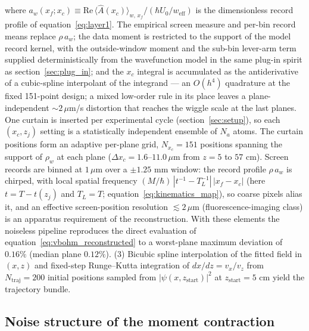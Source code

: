 \documentclass[11pt,a4paper]{article}
\newcommand{\weakvalps}[2]{\langle #1 \rangle_{w,\,#2}}
\begin{document}
where $a_w(x_f;x_c) \equiv \mathrm{Re}\,\weakvalps{\hat A(x_c)}{x_f}/(\hbar U_0/w_\text{eff})$ is the dimensionless record profile of equation~\eqref{eq:layer1}. The empirical screen measure and per-bin record means replace $\rho\,a_w$; the data moment is restricted to the support of the model record kernel, with the outside-window moment and the sub-bin lever-arm term supplied deterministically from the wavefunction model in the same plug-in spirit as section~\ref{sec:plug_in}; and the $x_c$ integral is accumulated as the antiderivative of a cubic-spline interpolant of the integrand --- an $O(h^4)$ quadrature at the fixed 151-point design; a mixed low-order rule in its place leaves a plane-independent $\sim 2\,\mu$m/s distortion that reaches the wiggle scale at the last planes. One curtain is inserted per experimental cycle (section~\ref{sec:setup}), so each $(x_c, z_j)$ setting is a statistically independent ensemble of $N_a$ atoms. The curtain positions form an adaptive per-plane grid, $N_{x_c} = 151$ positions spanning the support of $\rho_w$ at each plane ($\Delta x_c = 1.6$--$11.0\,\mu$m from $z = 5$ to $57$ cm). Screen records are binned at $1\,\mu$m over a $\pm 1.25$ mm window: the record profile $\rho\,a_w$ is chirped, with local spatial frequency $(M/\hbar)\,|t^{-1} - T_L^{-1}|\,|x_f - x_c|$ (here $t = T - t(z_j)$ and $T_L = T$; equation~\eqref{eq:kinematics_map}), so coarse pixels alias it, and an effective screen-position resolution $\lesssim 2\,\mu$m (fluorescence-imaging class) is an apparatus requirement of the reconstruction. With these elements the noiseless pipeline reproduces the direct evaluation of equation~\eqref{eq:vbohm_reconstructed} to a worst-plane maximum deviation of $0.16\%$ (median plane $0.12\%$). (3) Bicubic spline interpolation of the fitted field in $(x, z)$ and fixed-step Runge--Kutta integration of $dx/dz = v_x/v_z$ from $N_\text{traj} = 200$ initial positions sampled from $|\psi(x, z_\text{start})|^2$ at $z_\text{start} = 5$ cm yield the trajectory bundle.

\subsection{Noise structure of the moment contraction}
\label{sec:reconstruction_results}
\end{document}
